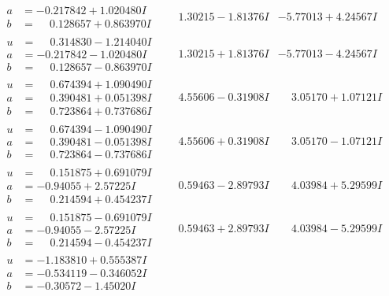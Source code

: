 \documentclass[1p]{elsarticle_modified}
\theoremstyle{definition}
\begin{document}
$$\begin{array}{c|c|c}
\begin{aligned}
a &= -0.217842 + 1.020480 I \\
b &= \phantom{-}0.128657 + 0.863970 I\end{aligned}
 & \phantom{-}1.30215 - 1.81376 I & -5.77013 + 4.24567 I \\ \hline\begin{aligned}
u &= \phantom{-}0.314830 - 1.214040 I \\
a &= -0.217842 - 1.020480 I \\
b &= \phantom{-}0.128657 - 0.863970 I\end{aligned}
 & \phantom{-}1.30215 + 1.81376 I & -5.77013 - 4.24567 I \\ \hline\begin{aligned}
u &= \phantom{-}0.674394 + 1.090490 I \\
a &= \phantom{-}0.390481 + 0.051398 I \\
b &= \phantom{-}0.723864 + 0.737686 I\end{aligned}
 & \phantom{-}4.55606 - 0.31908 I & \phantom{-}3.05170 + 1.07121 I \\ \hline\begin{aligned}
u &= \phantom{-}0.674394 - 1.090490 I \\
a &= \phantom{-}0.390481 - 0.051398 I \\
b &= \phantom{-}0.723864 - 0.737686 I\end{aligned}
 & \phantom{-}4.55606 + 0.31908 I & \phantom{-}3.05170 - 1.07121 I \\ \hline\begin{aligned}
u &= \phantom{-}0.151875 + 0.691079 I \\
a &= -0.94055 + 2.57225 I \\
b &= \phantom{-}0.214594 + 0.454237 I\end{aligned}
 & \phantom{-}0.59463 - 2.89793 I & \phantom{-}4.03984 + 5.29599 I \\ \hline\begin{aligned}
u &= \phantom{-}0.151875 - 0.691079 I \\
a &= -0.94055 - 2.57225 I \\
b &= \phantom{-}0.214594 - 0.454237 I\end{aligned}
 & \phantom{-}0.59463 + 2.89793 I & \phantom{-}4.03984 - 5.29599 I \\ \hline\begin{aligned}
u &= -1.183810 + 0.555387 I \\
a &= -0.534119 - 0.346052 I \\
b &= -0.30572 - 1.45020 I\end{aligned}

\end{array}$$
\end{document}
